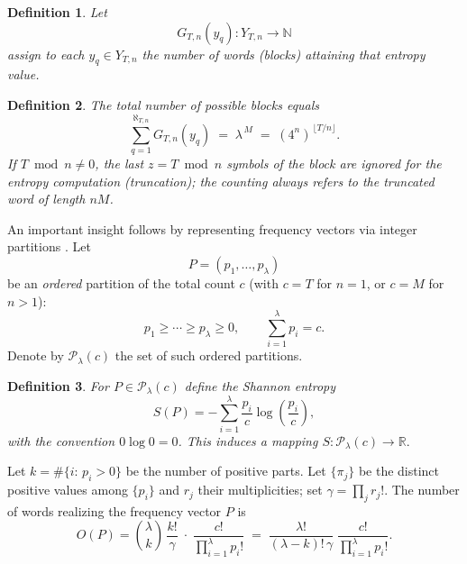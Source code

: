 \documentclass{article}
\newtheorem{Definition}{Definition}[section]
\theoremstyle{remark}
\begin{document}
\begin{Definition}\label{def:2.3}
Let 
\begin{equation}
G_{T,n}(y_q) : Y_{T,n} \to \mathbb{N}
\end{equation}
assign to each \(y_q\in Y_{T,n}\) the number of words (blocks) attaining that entropy value.
\end{Definition}

\begin{Definition}\label{def:2.4}
The total number of possible blocks equals
\begin{equation}
\sum_{q=1}^{\aleph_{T,n}} G_{T,n}(y_q) \;=\; \lambda^{\,M} \;=\; (4^n)^{\,\lfloor T/n\rfloor}.
\end{equation}
If \(T \bmod n \neq 0\), the last \(z=T\bmod n\) symbols of the block are ignored for the entropy computation (truncation); the counting always refers to the truncated word of length \(nM\).
\end{Definition}



An important insight follows by representing frequency vectors via integer partitions \cite{ref29}. Let
\begin{equation}
P = (p_1,\ldots,p_\lambda)
\end{equation}
be an \emph{ordered} partition of the total count \(c\) (with \(c=T\) for \(n=1\), or \(c=M\) for \(n>1\)):
\begin{equation}
p_1 \ge \cdots \ge p_\lambda \ge 0,\qquad \sum_{i=1}^{\lambda} p_i = c.
\end{equation}
Denote by \(\mathcal{P}_{\lambda}(c)\) the set of such ordered partitions.

\begin{Definition}\label{def:2.6}
For \(P\in\mathcal{P}_{\lambda}(c)\) define the Shannon entropy
\begin{equation}
S(P) = -\sum_{i=1}^{\lambda} \frac{p_i}{c}\log\!\left(\frac{p_i}{c}\right),
\end{equation}
with the convention \(0\log 0=0\). This induces a mapping
\(
S:\mathcal{P}_{\lambda}(c)\to\mathbb{R}.
\)
\end{Definition}

Let \(k=\#\{i:\,p_i>0\}\) be the number of positive parts. Let \(\{\pi_j\}\) be the distinct positive values among \(\{p_i\}\) and \(r_j\) their multiplicities; set \(\gamma=\prod_j r_j!\). The number of words realizing the frequency vector \(P\) is
\begin{equation}
O(P)
= \binom{\lambda}{k}\,\frac{k!}{\gamma}\;\cdot\;\frac{c!}{\prod_{i=1}^{\lambda} p_i!}
\;=\; \frac{\lambda!}{(\lambda-k)!\,\gamma}\;\frac{c!}{\prod_{i=1}^{\lambda} p_i!}.
\end{equation}
\end{document}
